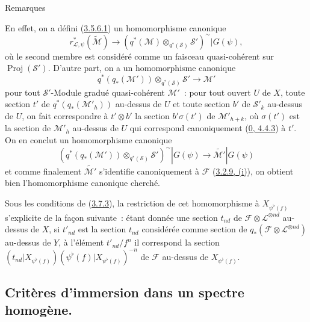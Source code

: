 \begin{namedtheorem}[3.7.9]{Remarques}
\begin{enumerate}
    En effet, on a défini (\hyperref[II.3.5.6.1-fr]{3.5.6.1}) un
    homomorphisme canonique
    \[
    \label{II.3.7.9.3-fr}
      r_{\mathcal{L},\psi}^*(\widetilde{\mathcal{M}})
      \longrightarrow
      (q^*(\mathcal{M})\otimes_{q^*(\mathcal{S})}\mathcal{S}')^{\sim}
      |G(\psi),
    \tag{3.7.9.3}
    \]
    où le second membre est considéré comme un faisceau quasi-cohérent sur
    $\operatorname{Proj}(\mathcal{S}')$. D'autre part, on a un
    homomorphisme canonique
    \[
    \label{II.3.7.9.4-fr}
      q^*(q_*(\mathcal{M}'))\otimes_{q^*(\mathcal{S})}\mathcal{S}'
      \longrightarrow\mathcal{M}'
    \tag{3.7.9.4}
    \]
    pour tout $\mathcal{S}'$-Module gradué quasi-cohérent $\mathcal{M}'$~:
    pour tout ouvert $U$ de $X$, toute section $t'$ de
    $q^*(q_*(\mathcal{M}'_h))$ au-dessus de $U$ et toute section $b'$ de
    $\mathcal{S}'_k$ au-dessus de $U$, on fait correspondre à $t'\otimes b'$ la
    section $b'\sigma(t')$ de $\mathcal{M}'_{h+k}$, où $\sigma(t')$ est la
    section de $\mathcal{M}'_h$ au-dessus de $U$ qui correspond canoniquement
    (\hyperref[0.4.4.3-fr]{0, 4.4.3}) à $t'$. On en conclut un homomorphisme
    canonique
    \[
    \label{II.3.7.9.5-fr}
      (q^*(q_*(\mathcal{M}'))\otimes_{q^*(\mathcal{S})}\mathcal{S}')^{\sim}
      |G(\psi)\longrightarrow\widetilde{\mathcal{M}'}|G(\psi)
    \tag{3.7.9.5}
    \]
    et comme finalement $\widetilde{\mathcal{M}'}$ s'identifie
    canoniquement à $\mathcal{F}$
    (\hyperref[II.3.2.9-fr]{3.2.9, (i)}), on obtient bien l'homomorphisme
    canonique cherché.

    Sous les conditions de (\hyperref[II.3.7.3-fr]{3.7.3}), la restriction
    de cet homomorphisme à $X_{\psi^\flat(f)}$ s'explicite de la façon
    suivante~: étant donnée une section $t_{nd}$ de
    $\mathcal{F}\otimes\mathcal{L}^{\otimes nd}$ au-dessus de $X$, si
    $t'_{nd}$ est la section $t_{nd}$ considérée comme section de
    $q_*(\mathcal{F}\otimes\mathcal{L}^{\otimes nd})$ au-dessus de $Y$, à
    l'élément $t'_{nd}/f^n$ il correspond la section
    $(t_{nd}|X_{\psi^\flat(f)})
    (\psi^\flat(f)|X_{\psi^\flat(f)})^{-n}$ de $\mathcal{F}$ au-dessus de
    $X_{\psi^\flat(f)}$.
\end{enumerate}
\end{namedtheorem}


\subsection{Critères d'immersion dans un spectre homogène.}
\label{subsection:II.3.8-fr}

